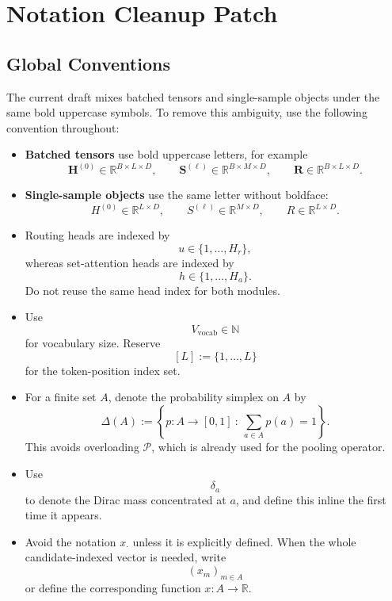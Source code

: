
\section*{Notation Cleanup Patch}

\subsection*{Global Conventions}

The current draft mixes batched tensors and single-sample objects under the same
bold uppercase symbols. To remove this ambiguity, use the following convention
throughout:
\begin{itemize}
    \item \textbf{Batched tensors} use bold uppercase letters, for example
    \[
    \mathbf H^{(0)} \in \mathbb R^{B\times L\times D},
    \qquad
    \mathbf S^{(\ell)} \in \mathbb R^{B\times M\times D},
    \qquad
    \mathbf R \in \mathbb R^{B\times L\times D}.
    \]
    \item \textbf{Single-sample objects} use the same letter without boldface:
    \[
    H^{(0)} \in \mathbb R^{L\times D},
    \qquad
    S^{(\ell)} \in \mathbb R^{M\times D},
    \qquad
    R \in \mathbb R^{L\times D}.
    \]
    \item Routing heads are indexed by
    \[
    u \in \{1,\dots,H_r\},
    \]
    whereas set-attention heads are indexed by
    \[
    h \in \{1,\dots,H_a\}.
    \]
    Do not reuse the same head index for both modules.
    \item Use
    \[
    V_{\mathrm{vocab}} \in \mathbb N
    \]
    for vocabulary size. Reserve
    \[
    [L] := \{1,\dots,L\}
    \]
    for the token-position index set.
    \item For a finite set \(A\), denote the probability simplex on \(A\) by
    \[
    \Delta(A)
    :=
    \left\{p:A\to[0,1]\ :\ \sum_{a\in A} p(a)=1\right\}.
    \]
    This avoids overloading \(\mathcal P\), which is already used for the pooling operator.
    \item Use
    \[
    \delta_a
    \]
    to denote the Dirac mass concentrated at \(a\), and define this inline the
    first time it appears.
    \item Avoid the notation \(x_{\cdot}\) unless it is explicitly defined.
    When the whole candidate-indexed vector is needed, write
    \[
    (x_m)_{m\in A}
    \]
    or define the corresponding function \(x:A\to\mathbb R\).
\end{itemize}

